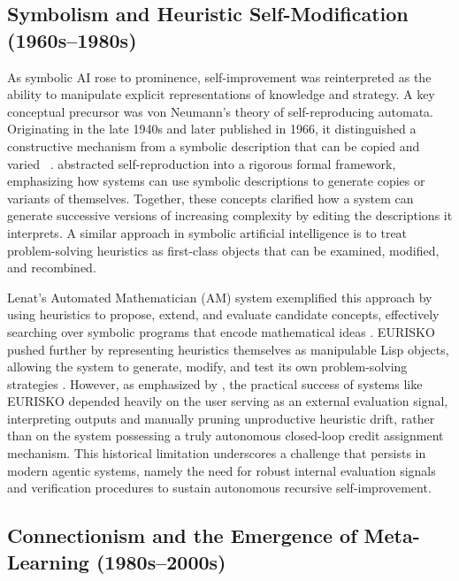\subsection{Symbolism and Heuristic Self-Modification (1960s–1980s)}
As symbolic AI rose to prominence, self-improvement was reinterpreted as the ability to manipulate explicit representations of knowledge and strategy. 
A key conceptual precursor was von Neumann's theory of self-reproducing automata. Originating in the late 1940s and later published in 1966, it distinguished a constructive mechanism from a symbolic description that can be copied and varied ~\citep{von1966theory}. \cite{myhill1964abstract} abstracted self-reproduction into a rigorous formal framework, emphasizing how systems can use symbolic descriptions to generate copies or variants of themselves. Together, these concepts clarified how a system can generate successive versions of increasing complexity by editing the descriptions it interprets. 
A similar approach in symbolic artificial intelligence is to treat problem-solving heuristics as first-class objects that can be examined, modified, and recombined.

 
Lenat’s Automated Mathematician (AM) system exemplified this approach by using heuristics to propose, extend, and evaluate candidate concepts, effectively searching over symbolic programs that encode mathematical ideas \citep{lenat11984automated}. EURISKO pushed further by representing heuristics themselves as manipulable Lisp objects, allowing the system to generate, modify, and test its own problem-solving strategies \citep{lenat1983eurisko, lenat1984and}. However, as emphasized by \cite{schmidhuber1987selfreferential}, the practical success of systems like EURISKO depended heavily on the user serving as an external evaluation signal, interpreting outputs and manually pruning unproductive heuristic drift, rather than on the system possessing a truly autonomous closed-loop credit assignment mechanism. This historical limitation underscores a challenge that persists in modern agentic systems, namely the need for robust internal evaluation signals and verification procedures to sustain autonomous recursive self-improvement. 



\subsection{Connectionism and the Emergence of Meta-Learning (1980s–2000s)}

